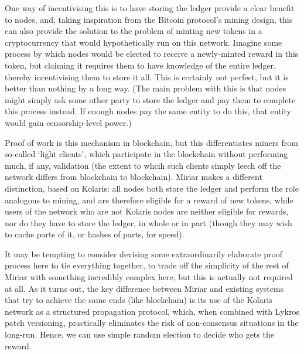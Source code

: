 \documentclass{extreport}
\begin{document}
One way of incentivising this is to have storing the ledger provide a clear benefit to nodes, and, taking inspiration from the Bitcoin protocol's mining design, this can also provide the solution to the problem of minting new tokens in a cryptocurrency that would hypothetically run on this network. Imagine some process by which nodes would be elected to receive a newly-minted reward in this token, but claiming it requires them to have knowledge of the entire ledger, thereby incentivising them to store it all. This is certainly not perfect, but it is better than nothing by a long way. (The main problem with this is that nodes might simply ask some other party to store the ledger and pay them to complete this process instead. If enough nodes pay the same entity to do this, that entity would gain censorship-level power.)

Proof of work is this mechanism in blockchain, but this differentiates miners from so-called `light clients', which participate in the blockchain without performing much, if any, validation (the extent to whcih such clients simply leech off the network differs from blockchain to blockchain). Miriar makes a different distinction, based on Kolaris: all nodes both store the ledger and perform the role analogous to mining, and are therefore eligible for a reward of new tokens, while users of the network who are not Kolaris nodes are neither eligible for rewards, nor do they have to store the ledger, in whole or in part (though they may wish to cache parts of it, or hashes of parts, for speed).

It may be tempting to consider devising some extraordinarily elaborate proof process here to tie everything together, to trade off the simplicity of the rest of Miriar with something incredibly complex here, but this is actually not required at all. As it turns out, the key difference between Miriar and existing systems that try to achieve the same ends (like blockchain) is its use of the Kolaris network as a structured propagation protocol, which, when combined with Lykros patch versioning, practically eliminates the risk of non-consensus situations in the long-run. Hence, we can use simple random election to decide who gets the reward.
\end{document}
